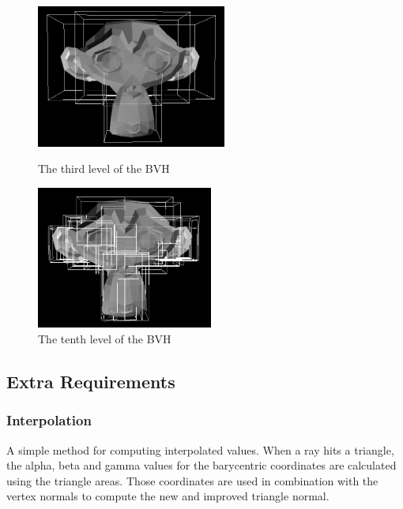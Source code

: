 \documentclass{article}
\begin{document}
      \begin{figure}[!htb]
          \includegraphics[width=\linewidth, height=4.7cm]{images/bvh_level_three}
          \caption*{The third level of the BVH}
        \endminipage\hfill
          \includegraphics[width=\linewidth, height=4.7cm]{images/bvh_level_ten}
          \caption*{The tenth level of the BVH}
        \endminipage
    \end{figure}

    \newpage

    \subsection{Extra Requirements}
    \subsubsection{Interpolation}
    A simple method for computing interpolated values. When a ray hits a triangle, the alpha, beta and gamma 
    values for the barycentric coordinates are calculated using the triangle areas. Those coordinates are 
    used in combination with the vertex normals to compute the new and improved triangle normal.
\end{document}
